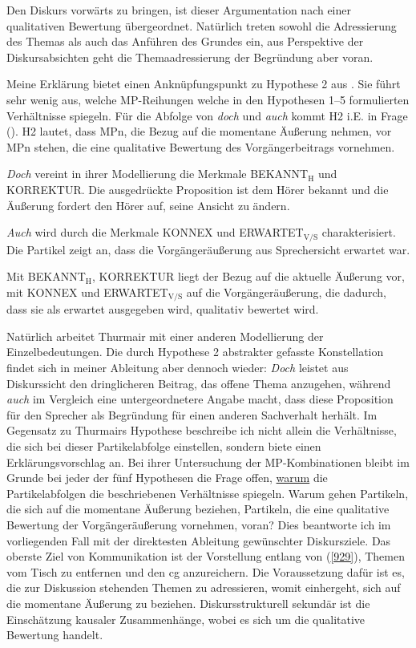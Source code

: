 {Den Diskurs vorwärts zu bringen, ist dieser Argumentation nach einer qualitativen Bewertung übergeordnet. Natürlich treten sowohl die Adressierung des Themas als auch das Anführen des Grundes ein, aus Perspektive der Diskursabsichten geht die Themaadressierung der Begründung aber voran.

Meine Erklärung bietet einen Anknüpfungspunkt zu Hypothese 2 aus \citet[288]{Thurmair1989}. Sie führt sehr wenig aus, welche MP-Reihungen welche in den Hypothesen 1–5 formulierten Verhältnisse spiegeln. Für die Abfolge von \textit{doch} und \textit{auch} kommt H2 i.E. in Frage (\citeyear[288]{Thurmair1989}). H2 lautet, dass MPn, die Bezug auf die momentane Äußerung nehmen, vor MPn stehen, die eine qualitative Bewertung des Vorgängerbeitrags vornehmen. 

\textit{Doch} vereint in ihrer Modellierung die Merkmale BEKANNT$_{\textrm{H}}$ und KORREKTUR. Die ausgedrückte Proposition ist dem Hörer bekannt und die Äußerung fordert den Hörer auf, seine Ansicht zu ändern.

\textit{Auch} wird durch die Merkmale KONNEX und ERWARTET$_{\textrm{V/S}}$ charakterisiert. Die Partikel zeigt an, dass die Vorgängeräußerung aus Sprechersicht erwartet war.

Mit BEKANNT$_{\textrm{H}}$, KORREKTUR liegt der Bezug auf die aktuelle Äußerung vor, mit KONNEX und ERWARTET$_{\textrm{V/S}}$ auf die Vorgängeräußerung, die dadurch, dass sie als erwartet ausgegeben wird, qualitativ bewertet wird.

Natürlich arbeitet Thurmair mit einer anderen Modellierung der Einzelbedeutungen. Die durch Hypothese 2 abstrakter gefasste Konstellation findet sich in meiner Ableitung aber dennoch wieder: \textit{Doch} leistet aus Diskurssicht den dringlicheren Beitrag, das offene Thema anzugehen, während \textit{auch} im Vergleich eine untergeordnetere Angabe macht, dass diese Proposition für den Sprecher als Begründung für einen anderen Sachverhalt herhält. Im Gegensatz zu Thurmairs Hypothese beschreibe ich nicht allein die Verhältnisse, die sich bei dieser Partikelabfolge einstellen, sondern biete einen Erklärungsvorschlag an. Bei ihrer Untersuchung der MP-Kombinationen bleibt im Grunde bei jeder der fünf Hypothesen die Frage offen, \underline{warum} die Partikelabfolgen die beschriebenen Verhältnisse spiegeln. Warum gehen Partikeln, die sich auf die momentane Äußerung beziehen, Partikeln, die eine qualitative Bewertung der Vorgängeräußerung vor\-nehmen, voran? Dies beantworte ich im vorliegenden Fall mit der direktesten Ableitung gewünschter Diskursziele. Das oberste Ziel von Kommunikation ist der Vorstellung entlang von (\ref{929}), Themen vom Tisch zu entfernen und den cg anzureichern. Die Voraussetzung dafür ist es, die zur Diskussion stehenden Themen zu adressieren, womit einhergeht, sich auf die momentane Äußerung zu beziehen. Diskursstrukturell sekundär ist die Einschätzung kausaler Zusammenhänge, wobei es sich um die qualitative Bewertung handelt. 

}
